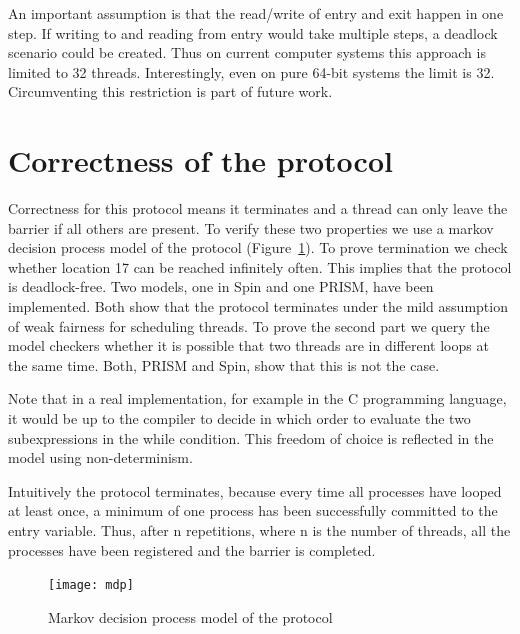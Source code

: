 \documentclass[a4paper, 10pt]{article}
\begin{document}
An important assumption is that the read/write of entry and exit happen in one step. If writing to and reading from entry would take multiple steps, a deadlock scenario could be created. Thus on current computer systems this approach is limited to 32 threads. Interestingly, even on pure 64-bit systems the limit is 32. Circumventing this restriction is part of future work.

\section{Correctness of the protocol}
\label{sec:correctness}
Correctness for this protocol means it terminates and a thread can only leave the barrier if all others are present. To verify these two properties we use a markov decision process model of the protocol (Figure~\ref{fig:mdp}). To prove termination we check whether location 17 can be reached infinitely often. This implies that the protocol is deadlock-free. Two models, one in Spin\cite{spin} and one PRISM\cite{prism}, have been implemented. Both show that the protocol terminates under the mild assumption of weak fairness for scheduling threads. To prove the second part we query the model checkers whether it is possible that two threads are in different loops at the same time. Both, PRISM and Spin, show that this is not the case.

Note that in a real implementation, for example in the C programming language, it would be up to the compiler to decide in which order to evaluate the two subexpressions in the while condition. This freedom of choice is reflected in the model using non-determinism.

Intuitively the protocol terminates, because every time all processes have looped at least once, a minimum of one process has been successfully committed to the entry variable. Thus, after n repetitions, where n is the number of threads, all the processes have been registered and the barrier is completed.

\begin{figure}[htbp]
	\centering
	\texttt{[image: mdp]}
	\caption{Markov decision process model of the protocol}
	\label{fig:mdp}
\end{figure}

\clearpage

\end{document}
